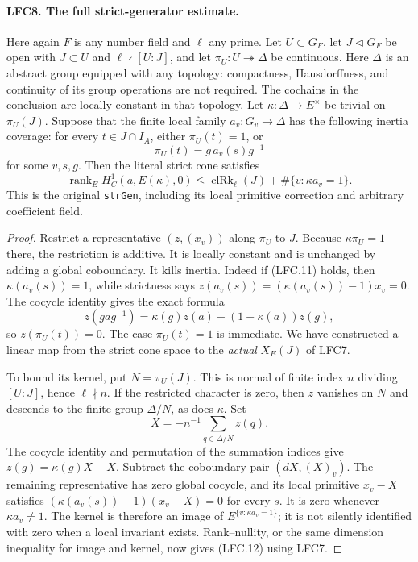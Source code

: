 \paragraph{LFC8. The full strict-generator estimate.}
\label{claim:LFC8}
Here again \(F\) is any number field and \(\ell\) any prime.
Let \(U\subset G_F\), let \(J\triangleleft G_F\) be open with
\(J\subset U\) and \(\ell\nmid[U:J]\), and let
\(\pi_U:U\twoheadrightarrow\Delta\) be continuous.
Here \(\Delta\) is an abstract group equipped with any topology:
compactness, Hausdorffness, and continuity of its group operations
are not required.  The cochains in the conclusion are locally
constant in that topology.
Let \(\kappa:\Delta\to E^\times\) be trivial on \(\pi_U(J)\).
Suppose that the finite local family \(a_v:G_v\to\Delta\)
has the following inertia coverage: for every
\(t\in J\cap I_A\), either \(\pi_U(t)=1\), or
\[
                    \pi_U(t)=g\,a_v(s)g^{-1}
                                                        \tag{LFC.11}
\]
for some \(v,s,g\).  Then the literal strict cone satisfies
\[
 \operatorname{rank}_E H^1_C(a,E(\kappa),0)
 \le \operatorname{clRk}_\ell(J)
           +\#\{v:\kappa a_v=1\}.                       \tag{LFC.12}
\]
This is the original \texttt{strGen}, including its local
primitive correction and arbitrary coefficient field.

\begin{proof}
Restrict a representative \((z,(x_v))\) along \(\pi_U\) to \(J\).
Because \(\kappa\pi_U=1\) there, the restriction is additive.
It is locally constant and is unchanged by adding a
global coboundary.  It kills inertia.  Indeed if (LFC.11)
holds, then \(\kappa(a_v(s))=1\), while strictness says
\(z(a_v(s))=(\kappa(a_v(s))-1)x_v=0\).
The cocycle identity gives the exact formula
\[
 z(gag^{-1})=\kappa(g)z(a)+(1-\kappa(a))z(g),             \tag{LFC.13}
\]
so \(z(\pi_U(t))=0\).  The case \(\pi_U(t)=1\) is immediate.
We have constructed a linear map from the strict cone
space to the \emph{actual} \(X_E(J)\) of LFC7.

To bound its kernel, put \(N=\pi_U(J)\).  This is normal
of finite index \(n\) dividing \([U:J]\), hence
\(\ell\nmid n\).  If the restricted character is zero,
then \(z\) vanishes on \(N\) and descends to
the finite group \(\Delta/N\), as does \(\kappa\).
Set
\[
           X=-n^{-1}\sum_{q\in\Delta/N}z(q).
\]
The cocycle identity and permutation of the summation
indices give \(z(g)=\kappa(g)X-X\).
Subtract the coboundary pair \((dX,(X)_v)\).
The remaining representative has zero global cocycle,
and its local primitive \(x_v-X\) satisfies
\((\kappa(a_v(s))-1)(x_v-X)=0\) for every \(s\).
It is zero whenever \(\kappa a_v\ne1\).
The kernel is therefore an image of
\(E^{\{v:\kappa a_v=1\}}\); it is not silently identified
with zero when a local invariant exists.
Rank--nullity, or the same dimension inequality for image
and kernel, now gives (LFC.12) using LFC7.
\end{proof}

